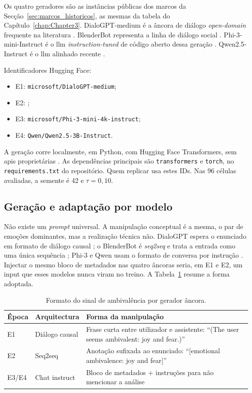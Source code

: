 Os quatro geradores são as instâncias públicas dos marcos da Secção~\ref{sec:marcos_historicos}, as mesmas da tabela do Capítulo~\ref{chap:Chapter3}. DialoGPT-medium é a âncora de diálogo \textit{open-domain} frequente na literatura \parencite{Zhang2020DialoGPT}. BlenderBot representa a linha de diálogo social \parencite{Roller2021BlenderBot}. Phi-3-mini-Instruct é o \gls{llm} \textit{instruction-tuned} de código aberto dessa geração \parencite{Abdin2024Phi3}. Qwen2.5-Instruct é o \gls{llm} alinhado recente \parencite{Yang2025Qwen25}.

Identificadores Hugging Face:
\begin{itemize}
 \item E1: \texttt{microsoft/DialoGPT-medium};
 \item E2: ;
 \item E3: \texttt{microsoft/Phi-3-mini-4k-instruct};
 \item E4: \texttt{Qwen/Qwen2.5-3B-Instruct}.
\end{itemize}

A geração corre localmente, em Python, com Hugging Face Transformers, sem \glspl{api} proprietárias \parencite{Wolf2020Transformers}. As dependências principais são \texttt{transformers} e \texttt{torch}, no \texttt{requirements.txt} do repositório. Quem replicar usa estes IDs. Nas 96 células avaliadas, a semente é 42 e \(\tau = 0{,}10\).

\subsection{Geração e adaptação por modelo}
\label{subsec:impl_manipulacao}

Não existe um \textit{prompt} universal. A manipulação conceptual é a mesma, o par de emoções dominantes, mas a realização técnica não. DialoGPT espera o enunciado em formato de diálogo causal \parencite{Zhang2020DialoGPT}; o BlenderBot é \textit{seq2seq} e trata a entrada como uma única sequência \parencite{Roller2021BlenderBot}; Phi-3 e Qwen usam o formato de conversa por instrução \parencite{Abdin2024Phi3, Yang2025Qwen25}. Injectar o mesmo bloco de metadados nas quatro âncoras seria, em E1 e E2, um input que esses modelos nunca viram no treino. A Tabela~\ref{tab:manipulacao_prompt} resume a forma adoptada.

\begin{table}[ht]
\centering
\caption{Formato do sinal de ambivalência por gerador âncora.}
\label{tab:manipulacao_prompt}
\begin{tabular}{ll>{\raggedright\arraybackslash}p{6.4cm}}
\hline
Época & Arquitectura & Forma da manipulação \\
\hline
E1 & Diálogo causal & Frase curta entre utilizador e assistente: ``(The user seems ambivalent: joy and fear.)'' \\
E2 & Seq2seq & Anotação sufixada ao enunciado: ``[emotional ambivalence: joy and fear]'' \\
E3/E4 & Chat instruct & Bloco de metadados + instruções para não mencionar a análise \\
\hline
\end{tabular}
\end{table}

